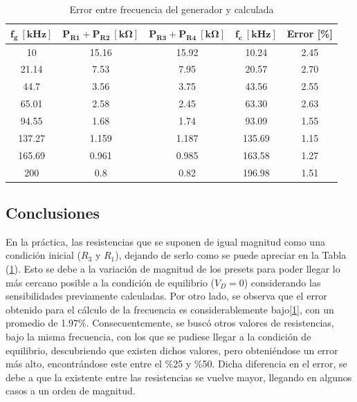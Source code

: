\begin{table}[H]
\centering
\begin{tabular}{ccccc}
\hline
$\mathbf{f_g \ [kHz]}$ & $\mathbf{P_{R1} + P_{R2} \ [k\Omega]}$ & $\mathbf{P_{R3} + P_{R4} \ [k\Omega]}$ & $\mathbf{f_c \ [kHz]}$ & \textbf{Error [\%]} \\
\hline
10                     & 15.16                                  & 15.92                                  & 10.24                  & 2.45                \\
21.14                  & 7.53                                   & 7.95                                   & 20.57                  & 2.70                \\
44.7                   & 3.56                                   & 3.75                                   & 43.56                  & 2.55                \\
65.01                  & 2.58                                   & 2.45                                   & 63.30                  & 2.63                \\
94.55                  & 1.68                                   & 1.74                                   & 93.09                  & 1.55                \\
137.27                 & 1.159                                  & 1.187                                  & 135.69                 & 1.15                \\
165.69                 & 0.961                                  & 0.985                                  & 163.58                 & 1.27                \\
200                    & 0.8                                    & 0.82                                   & 196.98                 & 1.51   				\\
\hline            
\end{tabular}
\caption{Error entre frecuencia del generador y calculada}
\label{tab:Tabla_error}
\end{table}

\subsection{Conclusiones}

En la práctica, las resistencias que se suponen de igual magnitud como una condición inicial ($R_3$ y $R_1$), dejando de serlo como se puede apreciar en la Tabla (\ref{tab:Tabla_error}). Esto se debe a la variación de magnitud de los presets para poder llegar lo más cercano posible a la condición de equilibrio ($V_D=0$) considerando las sensibilidades previamente calculadas. 
Por otro lado, se observa que el error obtenido para el cálculo de la frecuencia es considerablemente bajo[\ref{tab:Tabla_error}], con un promedio de 1.97\%. Consecuentemente, se buscó otros valores de resistencias, bajo la misma frecuencia, con los que se pudiese llegar a la condición de equilibrio, descubriendo que existen dichos valores, pero obteniéndose un error más alto, encontrándose este entre el \%25 y \%50. Dicha diferencia en el error, se debe a que la existente entre las resistencias se vuelve mayor, llegando en algunos casos a un orden de magnitud. 


